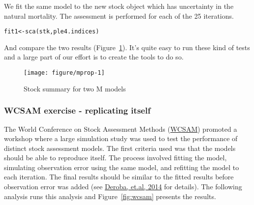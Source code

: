\documentclass[a4paper,english,10pt]{article}\usepackage[]{graphicx}\usepackage[]{color}
\makeatletter
\def\maxwidth{ %
  \ifdim\Gin@nat@width>\linewidth
    \linewidth
  \else
    \Gin@nat@width
  \fi
}
\newcommand{\hlstd}[1]{\textcolor[rgb]{0,0,0}{#1}}%
\newcommand{\hlkwb}[1]{\textcolor[rgb]{0.361,0.506,0.596}{#1}}%
\newcommand{\hlkwd}[1]{\textcolor[rgb]{0.361,0.506,0.596}{#1}}%
\newenvironment{kframe}{%
 \def\at@end@of@kframe{}%
 \ifinner\ifhmode%
  \def\at@end@of@kframe{\end{minipage}}%
  \begin{minipage}{\columnwidth}%
 \fi\fi%
 \def\FrameCommand##1{\hskip\@totalleftmargin \hskip-\fboxsep
 \colorbox{shadecolor}{##1}\hskip-\fboxsep
     \hskip-\linewidth \hskip-\@totalleftmargin \hskip\columnwidth}%
 \MakeFramed {\advance\hsize-\width
   \@totalleftmargin\z@ \linewidth\hsize
   \@setminipage}}%
 {\par\unskip\endMakeFramed%
 \at@end@of@kframe}
\newenvironment{knitrout}{}{} %
\makeatother
\begin{document}
We fit the same model to the new stock object which has uncertainty in the natural mortality.
The assessment is performed for each of the 25 iterations.

\begin{knitrout}
\color{fgcolor}\begin{kframe}
\begin{alltt}
\hlstd{fit1} \hlkwb{<-} \hlkwd{sca}\hlstd{(stk, ple4.indices)}
\end{alltt}
\end{kframe}
\end{knitrout}

And compare the two results (Figure~\ref{fig:mprop}). It's quite easy to run these kind of tests and a large part of our effort is to create the tools to do so. 

\begin{knitrout}
\color{fgcolor}\begin{figure}[H]

{\centering \texttt{[image: figure/mprop-1]} 

}

\caption[Stock summary for two M models]{Stock summary for two M models}\label{fig:mprop}
\end{figure}


\end{knitrout}



\subsubsection{WCSAM exercise - replicating itself}

The World Conference on Stock Assessment Methods (\href{http://www.ices.dk/news-and-events/symposia/WCSAM-2013}{WCSAM}) promoted a workshop where a large simulation study was used to test the performance of distinct stock assessment models. The first criteria used was that the models should be able to reproduce itself. The process involved fitting the model, simulating observation error using the same model, and refitting the model to each iteration. The final results should be similar to the fitted results before observation error was added (see \href{http://icesjms.oxfordjournals.org/content/early/2014/01/18/icesjms.fst237.abstract}{Deroba, et.al, 2014} for details). The following analysis runs this analysis and Figure~\ref{fig:wcsam} presents the results.
\end{document}
